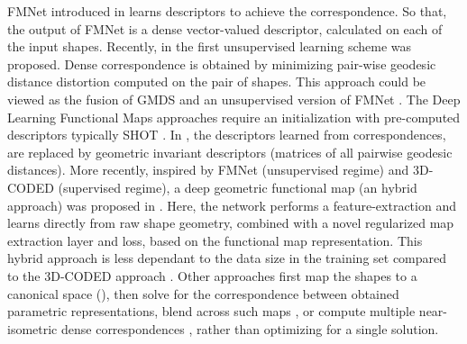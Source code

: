 FMNet introduced in \cite{litany2017deep} learns descriptors to achieve the correspondence. So that, the output of FMNet is a dense vector-valued descriptor, calculated on each of the input shapes. Recently, in \cite{halimi2019unsupervised} the first unsupervised learning scheme was proposed. Dense correspondence is obtained by minimizing pair-wise geodesic distance distortion computed on the pair of shapes. This approach could be viewed as the fusion of GMDS \cite{aflalo2016spectral} and an unsupervised version of FMNet \cite{litany2017deep}. The Deep Learning Functional Maps approaches require an initialization with pre-computed descriptors typically SHOT \cite{tombari2010unique}. In \cite{halimi2019unsupervised}, the descriptors learned from correspondences, are replaced by geometric invariant descriptors (matrices of all pairwise geodesic distances). More recently, inspired by FMNet (unsupervised regime) and 3D-CODED (supervised regime), a deep geometric functional map (\ie an hybrid approach) was proposed in \cite{donati2020deep}. Here, the network performs a feature-extraction and learns directly from raw shape geometry, combined with a novel regularized map extraction layer and loss, based on the functional map representation. This hybrid approach is less dependant to the data size in the training set compared to the 3D-CODED approach \cite{groueix20183d}. Other approaches first map the shapes to a canonical space (\eg \cite{ovsjanikov2010one}), then solve for the correspondence between obtained parametric representations, blend across such maps \cite{kim2011blended}, or compute multiple near-isometric dense correspondences \cite{ren2020maptree}, rather than optimizing for a single solution. 


%
 


